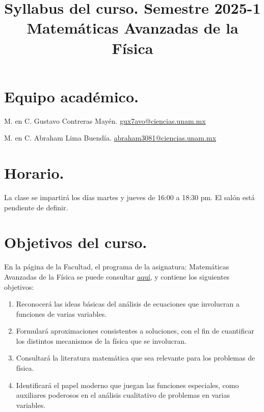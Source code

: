 \documentclass[12pt]{article}
\title{Syllabus del curso. Semestre 2025-1 \\ \large{Matemáticas Avanzadas de la Física}\vspace{-3ex}}
\author{}
\date{ }
\numberwithin{equation}{section}
\begin{document}
\vspace{-4cm}
\maketitle

\section{Equipo académico.}

M. en C. Gustavo Contreras Mayén. \hspace{0.3cm} \href{mailto:gux7avo@ciencias.unam.mx}{gux7avo@ciencias.unam.mx}

M. en C. Abraham Lima Buendía. \hspace{0.3cm} \href{mailto:abraham3081@ciencias.unam.mx}{abraham3081@ciencias.unam.mx}

\section{Horario.}

La clase se impartirá los días martes y jueves de 16:00 a 18:30 pm. El salón está pendiente de definir.

\section{Objetivos del curso.}

En la página de la Facultad, el programa de la asignatura: Matemáticas Avanzadas de la Física se puede consultar 
\href{https://www.fciencias.unam.mx/sites/default/files/temario/610.pdf}{aquí}, y contiene los siguientes objetivos:
\begin{enumerate}
\item Reconocerá las ideas básicas del análisis de ecuaciones que involucran a funciones de varias variables.
\item Formulará aproximaciones consistentes a soluciones, con el fin de cuantificar los distintos mecanismos de la física que se involucran.
\item Consultará la literatura matemática que sea relevante para los problemas de física.
\item Identificará el papel moderno que juegan las funciones especiales, como auxiliares poderosos en el análisis cualitativo de problemas en varias variables.
\end{enumerate}
\end{document}
